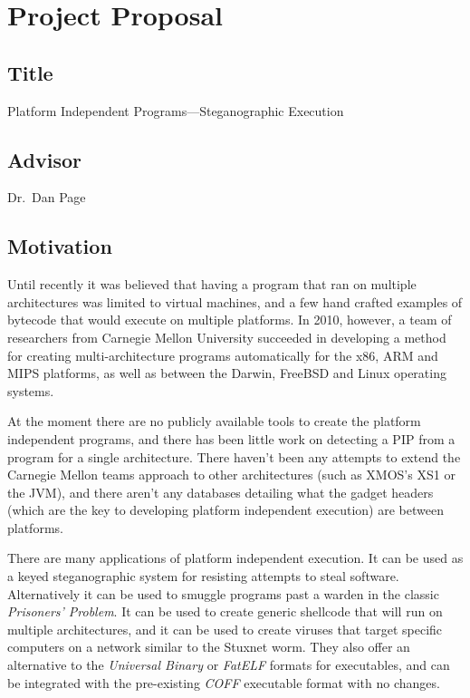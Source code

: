\section{Project Proposal}

\subsection{Title}

Platform Independent Programs---Steganographic Execution

\subsection{Advisor}

Dr.~Dan Page

\subsection{Motivation}

Until recently it was believed that having a program that ran on
multiple architectures was limited to virtual machines, and a few hand
crafted examples of bytecode that would execute on multiple platforms.
In 2010, however, a team of researchers from Carnegie Mellon University
succeeded in developing a method for creating multi-architecture
programs automatically for the x86, ARM and MIPS platforms, as well as
between the Darwin, FreeBSD and Linux operating systems.

At the moment there are no publicly available tools to create the
platform independent programs, and there has been little work on
detecting a PIP from a program for a single architecture. There haven't
been any attempts to extend the Carnegie Mellon teams approach to other
architectures (such as XMOS's XS1 or the JVM), and there aren't any
databases detailing what the gadget headers (which are the key to
developing platform independent execution) are between platforms.

There are many applications of platform independent execution. It can be
used as a keyed steganographic system for resisting attempts to steal
software. Alternatively it can be used to smuggle programs past a warden
in the classic \emph{Prisoners' Problem}. It can be used to create
generic shellcode that will run on multiple architectures, and it can be
used to create viruses that target specific computers on a network
similar to the Stuxnet worm. They also offer an alternative to the
\emph{Universal Binary} or \emph{FatELF} formats for executables, and
can be integrated with the pre-existing \emph{COFF} executable format
with no changes.

